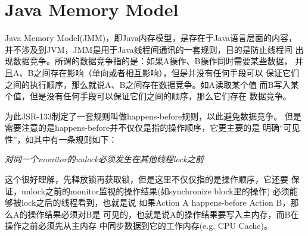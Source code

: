 ﻿\section[Java Memory Model]{Java Memory Model}
Java Memory Model(JMM)，即Java内存模型，是存在于Java语言层面的内容，
并不涉及到JVM，JMM是用于Java线程间通讯的一套规则，目的是防止线程间
出现数据竞争。所谓的数据竞争指的是：如果A操作、B操作同时需要某些数据，
并且A、B之间存在影响（单向或者相互影响），但是并没有任何手段可以
保证它们之间的执行顺序，那么就说A、B之间存在数据竞争。如A读取某个值
而B写入某个值，但是没有任何手段可以保证它们之间的顺序，那么它们存在
数据竞争。

为此JSR-133制定了一套规则叫做happens-before规则，以此避免数据竞争。
但是需要注意的是happens-before并不仅仅是指的操作顺序，它更主要的是
明确“可见性”，如其中有一条规则如下：

\emph{对同一个monitor的unlock必须发生在其他线程lock之前}

这个很好理解，先释放锁再获取锁，但是这里不仅仅指的是操作顺序，它还要
保证，unlock之前的monitor监视的操作结果(如synchronize block里的操作)
必须能够被lock之后的线程看到，也就是说
如果Action A happens-before Action B，那么A的操作结果必须对B是
可见的，也就是说A的操作结果要写入主内存，而B在操作之前必须先从主内存
中同步数据到它的工作内存(e.g. CPU Cache)。